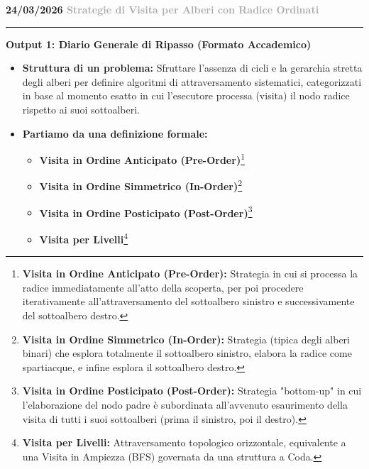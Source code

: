 \documentclass[a4paper, 11pt]{report}
\newcommand{\lezione}[2]{
\vspace{2em}
\noindent\textbf{\Large #1 \hfill \textcolor{darkgray}{#2}}
\vspace{0.5em}
\hrule
\vspace{1.5em}
}
\newcommand{\definizione}[2]{%
\textbf{#1}\footnote{\textbf{#1:} #2}%
}
\begin{document}
\lezione{24/03/2026}{Strategie di Visita per Alberi con Radice Ordinati}
\vspace{0.5cm}
\textbf{Output 1: Diario Generale di Ripasso (Formato Accademico)}
\begin{itemize}
\item \textbf{Struttura di un problema:}
Sfruttare l'assenza di cicli e la gerarchia stretta degli alberi per definire algoritmi di attraversamento sistematici, categorizzati in base al momento esatto in cui l'esecutore processa (visita) il nodo radice rispetto ai suoi sottoalberi.

\item \textbf{Partiamo da una definizione formale:}
\begin{itemize}
    \item \definizione{Visita in Ordine Anticipato (Pre-Order)}{Strategia in cui si processa la radice immediatamente all'atto della scoperta, per poi procedere iterativamente all'attraversamento del sottoalbero sinistro e successivamente del sottoalbero destro.}
    \item \definizione{Visita in Ordine Simmetrico (In-Order)}{Strategia (tipica degli alberi binari) che esplora totalmente il sottoalbero sinistro, elabora la radice come spartiacque, e infine esplora il sottoalbero destro.}
    \item \definizione{Visita in Ordine Posticipato (Post-Order)}{Strategia "bottom-up" in cui l'elaborazione del nodo padre è subordinata all'avvenuto esaurimento della visita di tutti i suoi sottoalberi (prima il sinistro, poi il destro).}
    \item \definizione{Visita per Livelli}{Attraversamento topologico orizzontale, equivalente a una Visita in Ampiezza (BFS) governata da una struttura a Coda.}
\end{itemize}


\end{itemize}
\end{document}
